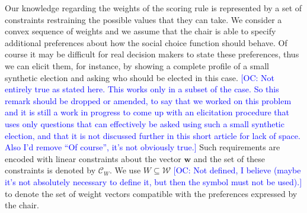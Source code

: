\documentclass[a4paper,twoside]{article}
\newcommand{\commentOC}[1]{\textcolor{blue}{\small$\big[$OC: #1$\big]$}}
\newcommand{\w}{\bm{w}}
\newcommand{\W}{\mathcal{W}}
\newcommand{\Co}{\mathcal{C}}
\newcommand{\pw}{W}%
\begin{document}
Our knowledge regarding the weights of the scoring rule is represented by
a set of constraints restraining the possible values that they can take. We consider a convex sequence of weights and we assume that 
the chair is able to specify additional preferences about how the social choice function should behave. Of course it may be difficult for real decision makers to state these preferences, thus we can elicit them, for instance, by showing a complete profile of a small synthetic election and asking who should be elected in this case. \commentOC{Not entirely true as stated here. This works only in a subset of the case. So this remark should be dropped or amended, to say that we worked on this problem and it is still a work in progress to come up with an elicitation procedure that uses only questions that can effectively be asked using such a small synthetic election, and that it is not discussed further in this short article for lack of space. Also I’d remove “Of course”, it’s not obviously true.}
Such requirements are encoded with linear constraints about the vector $\w$ and the set of these constraints is denoted by $\Co_W$. We use $\pw \subseteq \W$ \commentOC{Not defined, I believe (maybe it’s not absolutely necessary to define it, but then the symbol must not be used).} to denote the set of weight vectors compatible with the preferences expressed by the chair.
\end{document}
